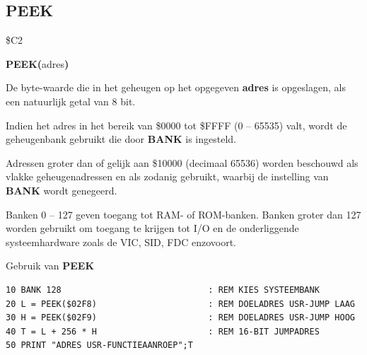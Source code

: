 \subsection{PEEK}
\begin{description}[leftmargin=2cm,style=nextline]
\item [Token:]    \$C2

\item [Formaat:]   {\bf PEEK(}adres{\bf)}

\item [Retourneert:]  De byte-waarde die in het geheugen op het opgegeven {\bf adres} is opgeslagen, als een natuurlijk getal van 8 bit.

Indien het adres in het bereik van \$0000 tot \$FFFF (0 -- 65535) valt, wordt de geheugenbank gebruikt die door {\bf BANK} is ingesteld.

                  Adressen groter dan of gelijk aan \$10000 (decimaal 65536) worden beschouwd als vlakke geheugenadressen en als zodanig gebruikt, waarbij de instelling van {\bf BANK} wordt genegeerd.

\item [Opmerkingen:]  Banken 0 -- 127 geven toegang tot RAM- of ROM-banken. Banken groter dan 127 worden gebruikt om toegang te krijgen tot I/O en de onderliggende systeemhardware zoals de VIC, SID, FDC enzovoort.

\item [Voorbeeld:]  Gebruik van {\bf PEEK}

\begin{tcolorbox}[colback=black,coltext=white]
\verbatimfont{\codefont}
\begin{verbatim}
10 BANK 128                             : REM KIES SYSTEEMBANK
20 L = PEEK($02F8)                      : REM DOELADRES USR-JUMP LAAG
30 H = PEEK($02F9)                      : REM DOELADRES USR-JUMP HOOG
40 T = L + 256 * H                      : REM 16-BIT JUMPADRES
50 PRINT "ADRES USR-FUNCTIEAANROEP";T
\end{verbatim}
\end{tcolorbox}
\end{description}


\newpage

